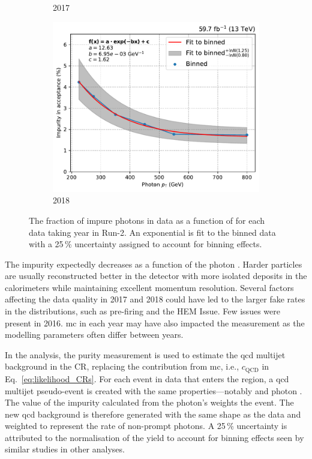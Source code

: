 \begin{figure}[htbp]
\begin{subfigure}[b]{0.49\textwidth}
        \caption{2017}
    \end{subfigure}

    \begin{subfigure}[b]{0.49\textwidth}
        \includegraphics[width=\textwidth]{figures/photon_purity/2018/impurity_plot_2018.pdf}
        \caption{2018}
    \end{subfigure}
    \caption[The fraction of impure photons in data as a function of \pt for each data taking year in Run-2]{The fraction of impure photons in data as a function of \pt for each data taking year in Run-2. An exponential is fit to the binned data with a 25\,\% uncertainty assigned to account for binning effects.}
    \label{fig:htoinv_photon_impurity}
\end{figure}

The impurity expectedly decreases as a function of the photon \pt. Harder particles are usually reconstructed better in the detector with more isolated deposits in the calorimeters while maintaining excellent momentum resolution. Several factors affecting the data quality in 2017 and 2018 could have led to the larger fake rates in the distributions, such as pre-firing and the HEM Issue. Few issues were present in 2016. \acrlong{mc} in each year may have also impacted the measurement as the modelling parameters often differ between years.

In the analysis, the purity measurement is used to estimate the \acrshort{qcd} multijet background in the \singlePhotonCr \gls{CR}, replacing the contribution from \acrshort{mc}, i.e., $c_{\mathrm{QCD}}$ in Eq.~\ref{eq:likelihood_CRs}. For each event in data that enters the region, a \acrshort{qcd} multijet pseudo-event is created with the same properties---notably \ptmiss and photon \pt. The value of the impurity calculated from the photon's \pt weights the event. The new \acrshort{qcd} background is therefore generated with the same shape as the data and weighted to represent the rate of non-prompt photons. A 25\,\% uncertainty is attributed to the normalisation of the yield to account for binning effects seen by similar studies in other analyses.


